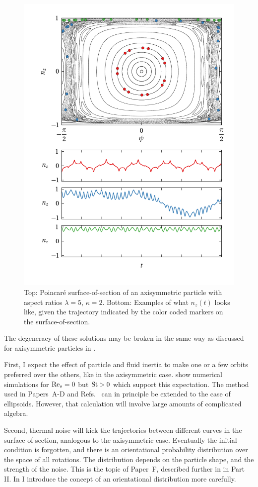 \documentclass[thesis.tex]{subfiles}
\begin{document}
\begin{figure}
\centering
\includegraphics[width=12cm]{figs/poincare2o00.png}%
\caption{\label{fig:poincare2o00} Top: Poincar\'e surface-of-section of an axisymmetric particle with aspect ratios $\lambda=5$, $\kappa=2$. Bottom: Examples of what $n_z(t)$ looks like, given the trajectory indicated by the color coded markers on the surface-of-section. 
}
\end{figure}


The degeneracy of these solutions may be broken in the same way as discussed for axisymmetric particles in .

First, I expect the effect of particle and fluid inertia to make one or a few orbits preferred over the others, like in the axisymmetric case. \citet{lundell2011} show numerical simulations for $\textrm{Re}_s=0$ but $\mbox{St}>0$ which support this expectation. The method used in Papers~A-D and Refs.~\cite{subramanian2005,subramanian2006} can in principle be extended to the case of ellipsoids. However, that calculation will involve large amounts of complicated algebra.

Second, thermal noise will kick the trajectories between different curves in the surface of section, analogous to the axisymmetric case. Eventually the initial condition is forgotten, and there is an orientational probability distribution over the space of all rotations. The distribution depends on the particle shape, and the strength of the noise. This is the topic of Paper~F, described further in  in Part II. In  I introduce the concept of an orientational distribution more carefully.
\end{document}
